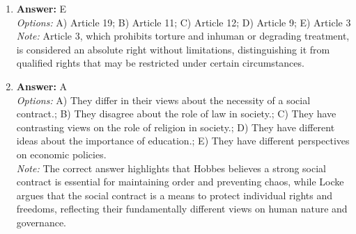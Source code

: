 \documentclass[12pt]{article}
\begin{document}
\begin{enumerate}[label=\arabic*.]
\item \textbf{Answer:} E
\\ \textit{Options:} A) Article 19; B) Article 11; C) Article 12; D) Article 9; E) Article 3
\\ \textit{Note:} Article 3, which prohibits torture and inhuman or degrading treatment, is considered an absolute right without limitations, distinguishing it from qualified rights that may be restricted under certain circumstances.
\item \textbf{Answer:} A
\\ \textit{Options:} A) They differ in their views about the necessity of a social contract.; B) They disagree about the role of law in society.; C) They have contrasting views on the role of religion in society.; D) They have different ideas about the importance of education.; E) They have different perspectives on economic policies.
\\ \textit{Note:} The correct answer highlights that Hobbes believes a strong social contract is essential for maintaining order and preventing chaos, while Locke argues that the social contract is a means to protect individual rights and freedoms, reflecting their fundamentally different views on human nature and governance.
\end{enumerate}
\end{document}

